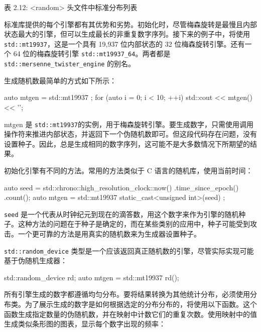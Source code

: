 \begin{center}
表 2.12: <random> 头文件中标准分布列表
\end{center}

标准库提供的每个引擎都有其优势和劣势。初始化时，尽管梅森旋转是最慢且内部状态最大的引擎，但可以生成最长的非重复数字序列。接下来的例子中，将使用 \verb|std::mt19937|，这是一个具有 19,937 位内部状态的 32 位梅森旋转引擎。还有一个 64 位的梅森旋转引擎 \verb|std::mt19937_64|。两者都是 \verb|std::mersenne_twister_engine| 的别名。

生成随机数最简单的方式如下所示：

\begin{cpp}
auto mtgen = std::mt19937 {};
for (auto i = 0; i < 10; ++i)
    std::cout << mtgen() << '\n';
\end{cpp}

mtgen 是 \verb|std::mt19937|的实例，用于梅森旋转引擎。要生成数字，只需使用调用操作符来推进内部状态，并返回下一个伪随机数即可。但这段代码存在问题，没有设置种子。因此，总是生成相同的数字序列，这可能不是大多数情况下所期望的结果。

初始化引擎有不同的方法。常用的方法类似于 C 语言的随机库，使用当前时间：

\begin{cpp}
auto seed = std::chrono::high_resolution_clock::now()
            .time_since_epoch()
            .count();
auto mtgen = std::mt19937{ static_cast<unsigned int>(seed) };
\end{cpp}

\verb|seed| 是一个代表从时钟纪元到现在的滴答数，用这个数字来作为引擎的随机种子。这种方法的问题在于种子是确定的，而在某些类别的应用中，种子可能受到攻击。一个更可靠的方法是用真实的随机数来为生成器设置种子。

\verb|std::random_device| 类型是一个应该返回真正随机数的引擎，尽管实际实现可能基于伪随机生成器：

\begin{cpp}
std::random_device rd;
auto mtgen = std::mt19937 {rd()};
\end{cpp}

所有引擎生成的数字都遵循均匀分布。要将结果转换为其他统计分布，必须使用分布类。为了展示生成的数字是如何根据选定的分布分布的，将使用以下函数。这个函数生成指定数量的伪随机数，并在映射中计数它们的重复次数。使用映射中的值生成类似条形图的图表，显示每个数字出现的频率：

